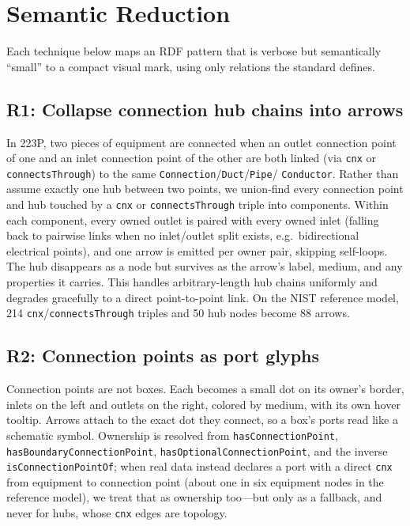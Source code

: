 \documentclass[10pt,twocolumn]{article}
\newcommand{\pred}[1]{\texttt{#1}}   %
\begin{document}
\section{Semantic Reduction}
\label{sec:reduction}

Each technique below maps an RDF pattern that is verbose but semantically
``small'' to a compact visual mark, using only relations the standard defines.

\subsection{R1: Collapse connection hub chains into arrows}
In 223P, two pieces of equipment are connected when an outlet connection point of
one and an inlet connection point of the other are both linked (via \pred{cnx} or
\pred{connectsThrough}) to the same \pred{Connection}/\pred{Duct}/\pred{Pipe}/
\pred{Conductor}. Rather than assume exactly one hub between two points, we
union-find every connection point and hub touched by a \pred{cnx} or
\pred{connectsThrough} triple into components. Within each component, every
owned outlet is paired with every owned inlet (falling back to pairwise links when
no inlet/outlet split exists, e.g.\ bidirectional electrical points), and one
arrow is emitted per owner pair, skipping self-loops. The hub disappears as a
node but survives as the arrow's label, medium, and any properties it carries.
This handles arbitrary-length hub chains uniformly and degrades gracefully to a
direct point-to-point link. On the NIST reference model, 214
\pred{cnx}/\pred{connectsThrough} triples and 50 hub nodes become 88 arrows.

\subsection{R2: Connection points as port glyphs}
Connection points are not boxes. Each becomes a small dot on its owner's border,
inlets on the left and outlets on the right, colored by medium, with its own
hover tooltip. Arrows attach to the exact dot they connect, so a box's ports read
like a schematic symbol. Ownership is resolved from
\pred{hasConnectionPoint}, \pred{hasBoundaryConnectionPoint},
\pred{hasOptionalConnectionPoint}, and the inverse \pred{isConnectionPointOf};
when real data instead declares a port with a direct \pred{cnx} from equipment to
connection point (about one in six equipment nodes in the reference model), we
treat that as ownership too---but only as a fallback, and never for hubs, whose
\pred{cnx} edges are topology.
\end{document}
